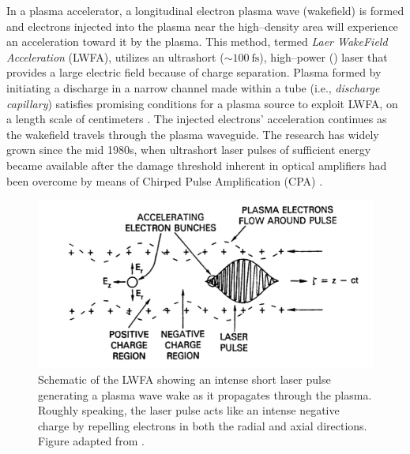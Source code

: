 \documentclass[../main.tex]{subfiles}
\begin{document}
In a plasma accelerator, a longitudinal electron plasma wave (wakefield) is formed and electrons injected into the plasma near the high--density area will experience an acceleration toward it by the plasma. This method, termed \emph{Laer WakeField Acceleration} (LWFA), utilizes an ultrashort ($\sim\SI{100}{\fs}$), high--power (\si{\TW}) laser that provides a large electric field because of charge separation. Plasma formed by initiating a discharge in a narrow channel made within a tube (i.e., \textit{discharge capillary}) satisfies promising conditions for a plasma source to exploit LWFA, on a length scale of centimeters \cite{Gonsalves2019PetawattWaveguide,Leemans2014Multi-GeVRegime}. The injected electrons' acceleration continues as the wakefield travels through the plasma waveguide. The research has widely grown since the mid 1980s, when ultrashort laser pulses of sufficient energy became available after the damage threshold inherent in optical amplifiers had been overcome by means of Chirped Pulse Amplification (CPA) \cite{Strickland1985CompressionPulses}.
\begin{figure}
    \centering
    \includegraphics[width=\textwidth]{figures/lwfa_schematic.PNG}
    \caption{Schematic of the LWFA showing an intense short laser pulse generating a plasma wave wake as it propagates through the plasma. Roughly speaking, the laser pulse acts like an intense negative charge by repelling electrons in both the radial and axial directions. Figure adapted from \href{https://aip.scitation.org/doi/pdf/10.1063/1.37621}{\cite{Sprangle1988LaserGuiding}}.}
    \label{fig:lwfa-schema}
\end{figure}

\end{document}
